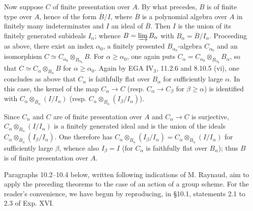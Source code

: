 Now suppose $C$ of finite presentation over $A$. By what precedes, $B$ is of finite type over $A$, hence of the form $\overline B/I$, where $\overline B$ is a polynomial algebra over $A$ in finitely many indeterminates and $I$ an ideal of $\overline B$. Then $I$ is the union of its finitely generated subideals $I_\alpha$; whence $B=\varinjlim B_\alpha$ with $B_\alpha=\overline B/I_\alpha$. Proceeding as above, there exist an index $\alpha_0$, a finitely presented $B_{\alpha_0}$-algebra $C_{\alpha_0}$ and an isomorphism $C\simeq C_{\alpha_0}\otimes_{B_{\alpha_0}}B$. For $\alpha\geq\alpha_0$, one again puts $C_\alpha=C_{\alpha_0}\otimes_{B_{\alpha_0}}B_\alpha$, so that $C\simeq C_\alpha\otimes_{B_\alpha}B$ for $\alpha\geq\alpha_0$. Again by EGA IV$_3$, 11.2.6 and 8.10.5 (vi), one concludes as above that $C_\alpha$ is faithfully flat over $B_\alpha$ for sufficiently large $\alpha$. In this case, the kernel of the map $C_\alpha\to C$ (resp. $C_\alpha\to C_\beta$ for $\beta\geq\alpha$) is identified with $C_\alpha\otimes_{B_\alpha}(I/I_\alpha)$ (resp. $C_\alpha\otimes_{B_\alpha}(I_\beta/I_\alpha)$).

Since $C_\alpha$ and $C$ are of finite presentation over $A$ and $C_\alpha\to C$ is surjective, $C_\alpha\otimes_{B_\alpha}(I/I_\alpha)$ is a finitely generated ideal and is the union of the ideals $C_\alpha\otimes_{B_\alpha}(I_\beta/I_\alpha)$. One therefore has $C_\alpha\otimes_{B_\alpha}(I_\beta/I_\alpha)=C_\alpha\otimes_{B_\alpha}(I/I_\alpha)$ for sufficiently large $\beta$, whence also $I_\beta=I$ (for $C_\alpha$ is faithfully flat over $B_\alpha$); thus $B$ is of finite presentation over $A$.

Paragraphs 10.2--10.4 below, written following indications of M. Raynaud, aim to apply the preceding theorems to the case of an action of a group scheme. For the reader's convenience, we have begun by reproducing, in §10.1, statements 2.1 to 2.3 of Exp. XVI.

